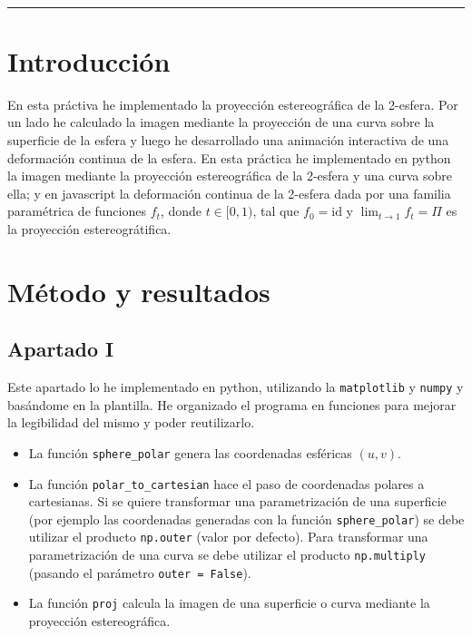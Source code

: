 \documentclass[10pt, spanish]{article}
\theoremstyle{definition}
\theoremstyle{break}
\begin{document}
\noindent\\\rule{\textwidth}{1pt}

\section{Introducción}
En esta práctiva he implementado la proyección estereográfica de la 2-esfera.
Por un lado he calculado la imagen mediante la proyección de una curva sobre la
superficie de la esfera y luego he desarrollado una animación interactiva de una
deformación continua de la esfera.
En esta práctica he implementado en python la imagen mediante la proyección
estereográfica de la 2-esfera y una curva sobre ella; y en javascript la
deformación continua de la 2-esfera dada por una familia paramétrica de
funciones $f_{t}$, donde $t\in[0,1)$, tal que $f_0=\text{id}$ y
$\lim_{t\rightarrow1}f_t=\Pi$ es la proyección estereográtifica.
    
\section{Método y resultados}

\subsection{Apartado I}

Este apartado lo he implementado en python, utilizando la \texttt{matplotlib} y
\texttt{numpy} y basándome en la plantilla. He organizado el programa en
funciones para mejorar la legibilidad del mismo y poder reutilizarlo. 

\begin{itemize}
    \item La función \texttt{sphere\_polar} genera las coordenadas esféricas $(u,v)$.
    \item La función \texttt{polar\_to\_cartesian} hace el paso de coordenadas
        polares a cartesianas. Si se quiere transformar una parametrización de
        una superficie (por ejemplo las coordenadas generadas con la función \texttt{sphere\_polar})
        se debe utilizar el producto \texttt{np.outer} (valor por defecto). Para transformar una
        parametrización de una curva se debe utilizar el producto
        \texttt{np.multiply} (pasando el parámetro \texttt{outer = False}).
    \item La función \texttt{proj} calcula la imagen de una superficie o curva
        mediante la proyección estereográfica.

\end{itemize}
\end{document}
